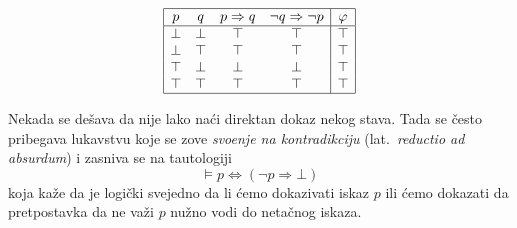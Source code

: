 \begin{table}[!h]
    $$
      \begin{array}{|cccc|c|c||c|}
      \hline
      p & q & p \Rightarrow q & \lnot q \Rightarrow \lnot p & \phi \\
      \hline
      \bot & \bot & \top & \top & \top \\
      \bot & \top & \top & \top & \top \\
      \top & \bot & \bot & \bot & \top \\
      \top & \top & \top & \top & \top \\
      \hline
      \end{array}
    $$
    \caption{Dokaz da je formula $\phi = (p \Rightarrow q) \Leftrightarrow (\lnot q \Rightarrow \lnot p)$ tautologija}
    \label{ft03.tab.primer-taut-0}
\end{table}

Nekada se de\v sava da nije lako na\'ci direktan dokaz nekog stava. Tada se \v cesto pribegava lukavstvu
koje se zove \emph{svo\dj enje na kontradikciju} (lat.~\emph{reductio ad absurdum}) i zasniva se na tautologiji
$$
  \vDash p \Leftrightarrow (\lnot p \Rightarrow \bot)
$$
koja ka\v ze da je logi\v cki svejedno da li \'cemo dokazivati iskaz $p$ ili \'cemo dokazati da
pretpostavka da ne va\v zi $p$ nu\v zno vodi do neta\v cnog iskaza.


